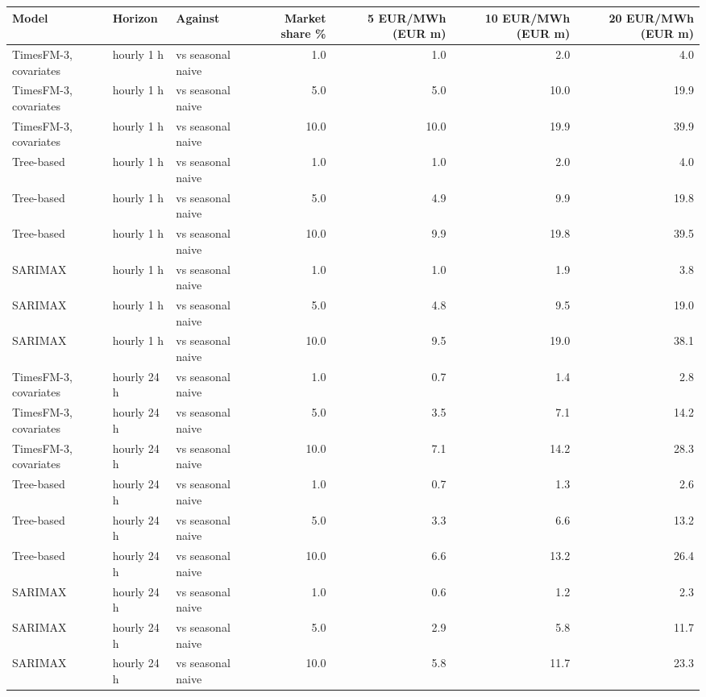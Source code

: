 \begin{tabular}{lllrrrr}
\toprule
Model & Horizon & Against & Market share \% & 5 EUR/MWh (EUR m) & 10 EUR/MWh (EUR m) & 20 EUR/MWh (EUR m) \\
\midrule
TimesFM-3, covariates & hourly 1 h & vs seasonal naive & 1.0 & 1.0 & 2.0 & 4.0 \\
TimesFM-3, covariates & hourly 1 h & vs seasonal naive & 5.0 & 5.0 & 10.0 & 19.9 \\
TimesFM-3, covariates & hourly 1 h & vs seasonal naive & 10.0 & 10.0 & 19.9 & 39.9 \\
Tree-based & hourly 1 h & vs seasonal naive & 1.0 & 1.0 & 2.0 & 4.0 \\
Tree-based & hourly 1 h & vs seasonal naive & 5.0 & 4.9 & 9.9 & 19.8 \\
Tree-based & hourly 1 h & vs seasonal naive & 10.0 & 9.9 & 19.8 & 39.5 \\
SARIMAX & hourly 1 h & vs seasonal naive & 1.0 & 1.0 & 1.9 & 3.8 \\
SARIMAX & hourly 1 h & vs seasonal naive & 5.0 & 4.8 & 9.5 & 19.0 \\
SARIMAX & hourly 1 h & vs seasonal naive & 10.0 & 9.5 & 19.0 & 38.1 \\
TimesFM-3, covariates & hourly 24 h & vs seasonal naive & 1.0 & 0.7 & 1.4 & 2.8 \\
TimesFM-3, covariates & hourly 24 h & vs seasonal naive & 5.0 & 3.5 & 7.1 & 14.2 \\
TimesFM-3, covariates & hourly 24 h & vs seasonal naive & 10.0 & 7.1 & 14.2 & 28.3 \\
Tree-based & hourly 24 h & vs seasonal naive & 1.0 & 0.7 & 1.3 & 2.6 \\
Tree-based & hourly 24 h & vs seasonal naive & 5.0 & 3.3 & 6.6 & 13.2 \\
Tree-based & hourly 24 h & vs seasonal naive & 10.0 & 6.6 & 13.2 & 26.4 \\
SARIMAX & hourly 24 h & vs seasonal naive & 1.0 & 0.6 & 1.2 & 2.3 \\
SARIMAX & hourly 24 h & vs seasonal naive & 5.0 & 2.9 & 5.8 & 11.7 \\
SARIMAX & hourly 24 h & vs seasonal naive & 10.0 & 5.8 & 11.7 & 23.3 \\
\bottomrule
\end{tabular}
